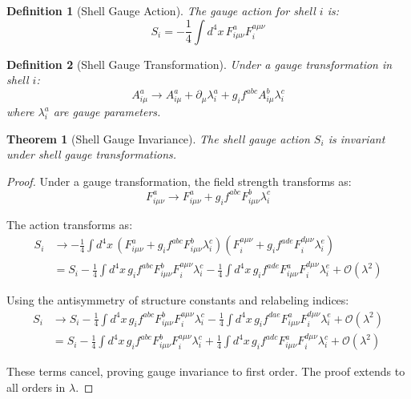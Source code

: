 \documentclass[12pt,a4paper]{article}
\newtheorem{theorem}{Theorem}[section]
\newtheorem{definition}{Definition}[section]
\begin{document}
\begin{definition}[Shell Gauge Action]
\label{def:gauge-action}
The gauge action for shell $i$ is:
\begin{equation}
S_i = -\frac{1}{4} \int d^4x \, F_{i\mu\nu}^a F_i^{a\mu\nu}
\end{equation}
\end{definition}

\begin{definition}[Shell Gauge Transformation]
\label{def:gauge-transformation}
Under a gauge transformation in shell $i$:
\begin{equation}
A_{i\mu}^a \to A_{i\mu}^a + \partial_\mu \lambda_i^a + g_i f^{abc} A_{i\mu}^b \lambda_i^c
\end{equation}
where $\lambda_i^a$ are gauge parameters.
\end{definition}

\begin{theorem}[Shell Gauge Invariance]
\label{thm:gauge-invariance}
The shell gauge action $S_i$ is invariant under shell gauge transformations.
\end{theorem}

\begin{proof}
Under a gauge transformation, the field strength transforms as:
\begin{equation}
F_{i\mu\nu}^a \to F_{i\mu\nu}^a + g_i f^{abc} F_{i\mu\nu}^b \lambda_i^c
\end{equation}

The action transforms as:
\begin{align}
S_i &\to -\frac{1}{4} \int d^4x \, (F_{i\mu\nu}^a + g_i f^{abc} F_{i\mu\nu}^b \lambda_i^c)(F_i^{a\mu\nu} + g_i f^{ade} F_i^{d\mu\nu} \lambda_i^e) \\
&= S_i -\frac{1}{4} \int d^4x \, g_i f^{abc} F_{i\mu\nu}^b F_i^{a\mu\nu} \lambda_i^c - \frac{1}{4} \int d^4x \, g_i f^{ade} F_{i\mu\nu}^a F_i^{d\mu\nu} \lambda_i^e + \mathcal{O}(\lambda^2)
\end{align}

Using the antisymmetry of structure constants and relabeling indices:
\begin{align}
S_i &\to S_i -\frac{1}{4} \int d^4x \, g_i f^{abc} F_{i\mu\nu}^b F_i^{a\mu\nu} \lambda_i^c - \frac{1}{4} \int d^4x \, g_i f^{dae} F_{i\mu\nu}^a F_i^{d\mu\nu} \lambda_i^e + \mathcal{O}(\lambda^2) \\
&= S_i -\frac{1}{4} \int d^4x \, g_i f^{abc} F_{i\mu\nu}^b F_i^{a\mu\nu} \lambda_i^c + \frac{1}{4} \int d^4x \, g_i f^{adc} F_{i\mu\nu}^a F_i^{d\mu\nu} \lambda_i^c + \mathcal{O}(\lambda^2)
\end{align}

These terms cancel, proving gauge invariance to first order. The proof extends to all orders in $\lambda$.
\end{proof}
\end{document}

